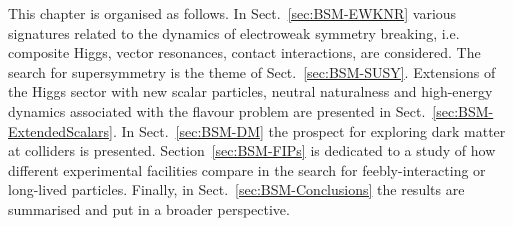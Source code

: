 \documentclass[../report.tex]{subfiles}
\begin{document}
This chapter is organised as follows. In Sect.~\ref{sec:BSM-EWKNR} various signatures related to the dynamics of electroweak symmetry breaking, i.e. composite Higgs, vector resonances, contact interactions, are considered. The search for supersymmetry is the theme of Sect.~\ref{sec:BSM-SUSY}. Extensions of the Higgs sector with new scalar particles, neutral naturalness and high-energy dynamics associated with the flavour problem are presented in Sect.~\ref{sec:BSM-ExtendedScalars}. In Sect.~\ref{sec:BSM-DM} the prospect for exploring dark matter at colliders is presented. Section~\ref{sec:BSM-FIPs} is dedicated to a study of how different experimental facilities compare in the search for feebly-interacting or long-lived particles. Finally, in Sect.~\ref{sec:BSM-Conclusions} the results are summarised and put in a broader perspective.
\end{document}
